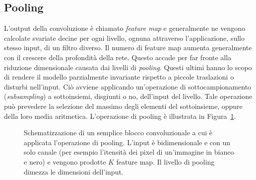 \subsection{Pooling}
L'output della convoluzione è chiamato \emph{feature map} e generalmente ne
vengono calcolate svariate decine per ogni livello, ognuna attraverso
l'applicazione, sullo stesso input, di un filtro diverso. Il numero di feature
map aumenta generalmente con il crescere della profondità della rete. Questo
accade per far fronte alla riduzione dimensionale causata dai livelli di
\emph{pooling}. Questi ultimi hanno lo scopo di rendere il modello parzialmente
invariante rispetto a piccole traslazioni o disturbi nell'input. Ciò avviene
applicando un'operazione di sottocampionamento (\emph{subsampling}) a
sottoinsiemi, disgiunti o no, dell'input del livello. Tale operazione può prevedere la
selezione del massimo degli elementi del sottoinsieme, oppure della loro media
aritmetica. L'operazione di pooling è illustrata in Figura~\ref{fig:pooling}.
\begin{figure}[htp]
  \caption{%
    Schematizzazione di un semplice blocco convoluzionale a cui è applicata
    l'operazione di pooling. L'input è bidimensionale e con un solo canale (per
    esempio l'itensità dei pixel di un'immagine in bianco e nero) e vengono
    prodotte \(K\) feature map. Il livello di pooling dimezza le dimensioni
    dell'input.
  }%
  \label{fig:pooling}
\end{figure}




